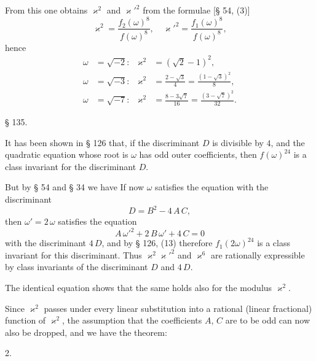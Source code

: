 
From this one obtains $\varkappa^2$ and $\varkappa'^2$ from the formulae [§ 54, (3)]
\[
\varkappa^2 = \frac{f_2(\omega)^8}{f(\omega)^8}, \quad \varkappa'^2 = \frac{f_1(\omega)^8}{f(\omega)^8},
\]
hence
\[
\begin{aligned}
\omega &= \sqrt{-2}\colon & \varkappa^2 &= (\sqrt{2} - 1)^2, \\
\omega &= \sqrt{-3}\colon & \varkappa^2 &= \frac{2 - \sqrt{3}}{4} = \frac{(1 - \sqrt{3})^2}{8}, \\
\omega &= \sqrt{-7}\colon & \varkappa^2 &= \frac{8 - 3\sqrt{7}}{16} = \frac{(3 - \sqrt{7})^2}{32}.
\end{aligned}
\]

\begin{center}
§ 135.\qquad {}
\end{center}

It has been shown in § 126 that, if the discriminant $D$ is divisible
by $4$, and the quadratic equation whose root is $\omega$ has odd
outer coefficients, then $f(\omega)^{24}$ is a class invariant
for the discriminant $D$.

But by § 54 and § 34 we have
If now $\omega$ satisfies the equation
with the discriminant
\[
D = B^2 - 4\,A\,C,
\]
then $\omega' = 2\,\omega$ satisfies the equation
\[
A\,\omega'^2 + 2\,B\,\omega' + 4\,C = 0
\]
with the discriminant $4\,D$, and by § 126, (13) therefore
$f_1(2\omega)^{24}$ is a class invariant for this discriminant. Thus
$\varkappa^2 \varkappa'^2$ and $\varkappa^6$ are rationally expressible by class invariants of the
discriminant $D$ and $4\,D$.

The identical equation
shows that the same holds also for the modulus $\varkappa^2$.

Since $\varkappa^2$ passes under every linear substitution into a rational
(linear fractional) function of $\varkappa^2$, the assumption that the
coefficients $A$, $C$ are to be odd can now also be dropped, and we
have the theorem:

2. 
